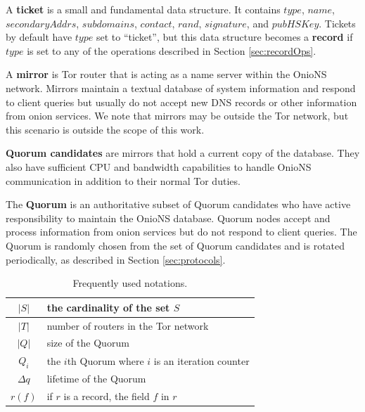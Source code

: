 \documentclass[USenglish,oneside,twocolumn]{article}
\begin{document}
A \textbf{ticket} is a small and fundamental data structure. It contains $ \mathit{type} $, $ \mathit{name} $, $ \mathit{secondaryAddrs} $, $ \mathit{subdomains} $, $ \mathit{contact} $, $ \mathit{rand} $, $ \mathit{signature} $, and $ \mathit{pubHSKey} $. Tickets by default have $ \mathit{type} $ set to ``ticket'', but this data structure becomes a \textbf{record} if $ \mathit{type} $ is set to any of the operations described in Section \ref{sec:recordOps}.

A \textbf{mirror} is Tor router that is acting as a name server within the OnioNS network. Mirrors maintain a textual database of system information and respond to client queries but usually do not accept new DNS records or other information from onion services. We note that mirrors may be outside the Tor network, but this scenario is outside the scope of this work.

\textbf{Quorum candidates} are mirrors that hold a current copy of the database. They also have sufficient CPU and bandwidth capabilities to handle OnioNS communication in addition to their normal Tor duties.

The \textbf{Quorum} is an authoritative subset of Quorum candidates who have active responsibility to maintain the OnioNS database. Quorum nodes accept and process information from onion services but do not respond to client queries. The Quorum is randomly chosen from the set of Quorum candidates and is rotated periodically, as described in Section \ref{sec:protocols}.

\begin{center}
	\vspace{-5mm}
	\begin{table}[htp]
		\centering
  		\begin{tabular}{ | c | l | }
			$ \left\vert{S}\right\vert $ & the cardinality of the set $ S $ \\ \hline
			$ \left\vert{T}\right\vert $ & number of routers in the Tor network \\ \hline
			$ \left\vert{Q}\right\vert $ & size of the Quorum \\ \hline
			$ Q_{i} $ & the $ i $th Quorum where $ i $ is an iteration counter \\ \hline
			$ \Delta q $ & lifetime of the Quorum \\ \hline
			$ r(f) $ & if $ r $ is a record, the field $ f $ in $ r $ \\
		\end{tabular}
		\caption{Frequently used notations.}
	\end{table}
	\vspace{-45pt}
	\label{table:freqUsedNotation}
\end{center}
\end{document}
